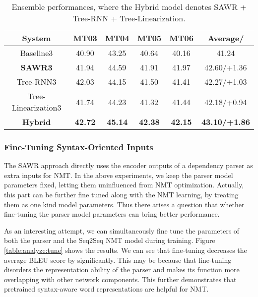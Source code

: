 \documentclass[11pt,a4paper]{article}
\begin{document}
\begin{CJK}{UTF8}{gbsn}
\setlength{\tabcolsep}{6pt}
\begin{table*}[ht]
\begin{center}
\begin{tabular}{c|cccc|c}
\hline
System & MT03  & MT04  & MT05  & MT06 & Average/ \\ \hline
Baseline3  &     40.90   &  43.25     &  40.64     &   40.16  & 41.24      \\ \hline
\textbf{SAWR}\textbf{3} &     41.94    &   44.59    &   41.91    &    41.97  &    42.60/+1.36   \\
Tree-RNN3 &    42.03    &   44.15    &   41.50    &   41.41   &  42.27/+1.03      \\
Tree-Linearization3 &     41.74    &   44.23    &   41.32    &   41.44   &  42.18/+0.94    \\ \hline
\textbf{Hybrid} &    \bf 42.72   &    \bf 45.14   &    \bf 42.38   &   \bf 42.15   &  \bf43.10/+1.86     \\ \hline
\end{tabular}
\caption{Ensemble performances, where the Hybrid model denotes SAWR + Tree-RNN + Tree-Linearization. } \label{table:chinese:ensemble:result}
\end{center}
\end{table*}




\subsubsection{Fine-Tuning Syntax-Oriented Inputs}
The SAWR approach directly uses the encoder outputs of a dependency parser as extra inputs for NMT.
In the above experiments, we keep the parser model parameters fixed, letting them uninfluenced from NMT optimization.
Actually, this part can be further fine tuned along with the NMT learning,
by treating them as one kind model parameters.
Thus there arises a question that whether fine-tuning the parser model parameters can bring better performance.

As an interesting attempt, we can simultaneously
fine tune the parameters of both the parser and the Seq2Seq NMT model during training.
Figure \ref{table:analyze:tune} shows the results.
We can see that fine-tuning decreases the average BLEU score by  significantly.
This may be because that fine-tuning disorders the representation ability of
the parser and makes its function more overlapping with other network components.
This further demonstrates that pretrained syntax-aware word representations are helpful for NMT.



\end{CJK}
\end{document}
